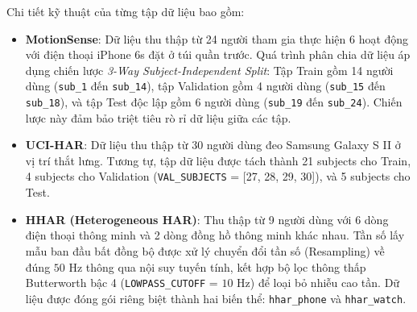 \begin{table}[h!]
\centering
\caption{Đặc tả chi tiết 3 bộ dữ liệu thực nghiệm HAR.}
\label{tab:dataset_specifications}
\end{table}

Chi tiết kỹ thuật của từng tập dữ liệu bao gồm:
\begin{itemize}
    \item \textbf{MotionSense}: Dữ liệu thu thập từ 24 người tham gia thực hiện 6 hoạt động với điện thoại iPhone 6s đặt ở túi quần trước. Quá trình phân chia dữ liệu áp dụng chiến lược \textit{3-Way Subject-Independent Split}: Tập Train gồm 14 người dùng (\texttt{sub\_1} đến \texttt{sub\_14}), tập Validation gồm 4 người dùng (\texttt{sub\_15} đến \texttt{sub\_18}), và tập Test độc lập gồm 6 người dùng (\texttt{sub\_19} đến \texttt{sub\_24}). Chiến lược này đảm bảo triệt tiêu rò rỉ dữ liệu giữa các tập.
    \item \textbf{UCI-HAR}: Dữ liệu thu thập từ 30 người dùng đeo Samsung Galaxy S II ở vị trí thắt lưng. Tương tự, tập dữ liệu được tách thành 21 subjects cho Train, 4 subjects cho Validation (\texttt{VAL\_SUBJECTS} = [27, 28, 29, 30]), và 5 subjects cho Test.
    \item \textbf{HHAR (Heterogeneous HAR)}: Thu thập từ 9 người dùng với 6 dòng điện thoại thông minh và 2 dòng đồng hồ thông minh khác nhau. Tần số lấy mẫu ban đầu bất đồng bộ được xử lý chuyển đổi tần số (Resampling) về đúng $50\text{ Hz}$ thông qua nội suy tuyến tính, kết hợp bộ lọc thông thấp Butterworth bậc 4 (\texttt{LOWPASS\_CUTOFF} = $10\text{ Hz}$) để loại bỏ nhiễu cao tần. Dữ liệu được đóng gói riêng biệt thành hai biến thể: \texttt{hhar\_phone} và \texttt{hhar\_watch}.
\end{itemize}

